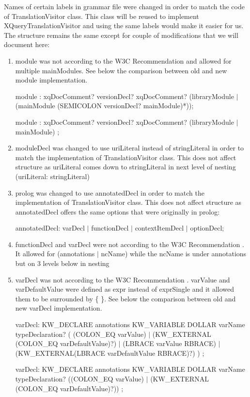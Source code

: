 Names of certain labels in grammar file were changed in order to match the code of TranslationVisitor class. This class will be reused to implement XQueryTranslationVisitor and using the same labels would make it easier for us. The structure remains the same except for couple of modifications that we will document here:
\begin{enumerate}
	\item module was not according to the W3C Recommendation \cite{XQueryRecommendation} and allowed for multiple mainModules. See below the comparison between old and new module implementation.
	
	module : xqDocComment? versionDecl? xqDocComment? (libraryModule $|$ (mainModule (SEMICOLON versionDecl? mainModule)*));
	
	module : xqDocComment? versionDecl? xqDocComment? (libraryModule $|$ mainModule) ;
	\item moduleDecl was changed to use uriLiteral instead of stringLiteral in order to match the implementation of TranslationVisitor class. This does not affect structure as uriLiteral comes down to stringLiteral in next level of nesting (uriLiteral: stringLiteral)
	\item prolog was changed to use annotatedDecl in order to match the implementation of TranslationVisitor class. This does not affect structure as annotatedDecl offers the same options that were originally in prolog:
	
	annotatedDecl: varDecl $|$ functionDecl	$|$ contextItemDecl $|$ optionDecl;
	
	\item functionDecl and varDecl were not according to the W3C Recommendation \cite{XQueryRecommendation}. It allowed for (annotations $|$ ncName) while the ncName is under annotations but on 3 levels below in nesting
 	
	\item varDecl was not according to the W3C Recommendation \cite{XQueryRecommendation}. varValue and varDefaultValue were defined as expr instead of exprSingle and it allowed them to be surrounded by \{ \}. See below the comparison between old and new varDecl implementation.
	
	varDecl: KW\_DECLARE annotations KW\_VARIABLE DOLLAR varName typeDeclaration?
	(
	(COLON\_EQ varValue)
	$|$ (KW\_EXTERNAL (COLON\_EQ varDefaultValue)?)
	$|$ (LBRACE varValue RBRACE)
	$|$ (KW\_EXTERNAL(LBRACE varDefaultValue RBRACE)?)
	) ; 
	
	varDecl: KW\_DECLARE annotations KW\_VARIABLE DOLLAR varName typeDeclaration?
	((COLON\_EQ varValue)
	$|$ (KW\_EXTERNAL (COLON\_EQ varDefaultValue)?)) ;
	

\end{enumerate}
